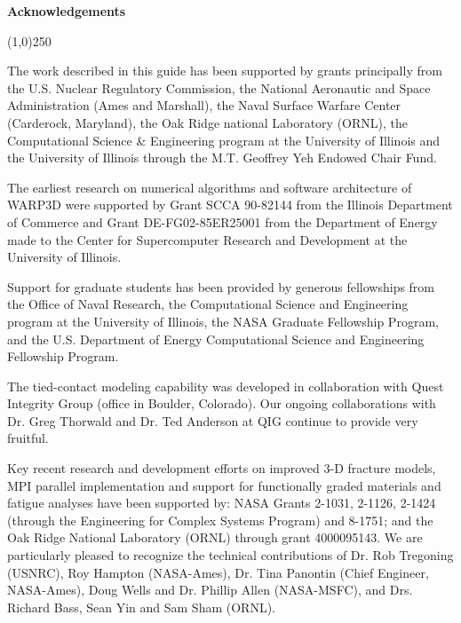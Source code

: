 \documentclass[10pt]{report}
\begin{document}
\noindent
\LARGE
\begin{center}
 \textbf{
{\selectfont Acknowledgements}}
\end{center}
\normalsize
%
\begin{center}
\line(1,0){250}
\end{center}

\vspace{0.2in}

%
%
The work described in this guide has been supported by grants principally from 
the U.S. Nuclear Regulatory Commission,  the National Aeronautic and Space 
Administration (Ames and Marshall), the Naval Surface Warfare Center 
(Carderock, Maryland), the Oak Ridge national Laboratory (ORNL), 
the Computational Science \& Engineering program at the University of Illinois
and the University of Illinois through the M.T. Geoffrey Yeh Endowed Chair Fund.

The earliest research on numerical algorithms and software architecture 
of WARP3D were supported by Grant SCCA 90-82144 from the Illinois 
Department of Commerce and Grant DE-FG02-85ER25001 from the 
Department of Energy made to the Center for Supercomputer 
Research and Development at the University of Illinois.

Support for graduate students has been provided by generous fellowships 
from the Office of Naval Research, the Computational Science and 
Engineering program at the University of Illinois, the NASA Graduate 
Fellowship Program, and the U.S. Department of Energy 
Computational Science and Engineering Fellowship Program.  

The tied-contact modeling capability was developed in collaboration 
with Quest Integrity 
Group (office in Boulder, Colorado). Our ongoing collaborations 
with Dr. Greg Thorwald and Dr. Ted Anderson at QIG continue to provide very fruitful. 

Key recent research and development efforts on improved 3-D 
fracture models, MPI parallel implementation and support for 
functionally graded materials and fatigue analyses have been supported 
by: NASA Grants 2-1031, 2-1126, 2-1424 (through the Engineering for 
Complex Systems Program) and 8-1751; and the Oak Ridge National 
Laboratory (ORNL) through grant 4000095143.  We are particularly 
pleased to recognize the technical contributions of Dr. Rob Tregoning (USNRC), 
Roy Hampton (NASA-Ames), Dr. Tina Panontin (Chief Engineer, NASA-Ames), 
Doug Wells and Dr. Phillip Allen (NASA-MSFC), and Drs. Richard Bass, Sean Yin 
and Sam Sham (ORNL).
\end{document}
